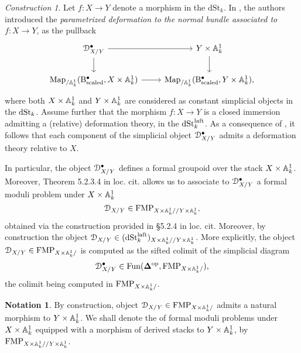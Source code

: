 \documentclass[10pt,a4paper,reqno]{amsart} %
\theoremstyle{plain}
\theoremstyle{definition}
\newtheorem{notation}[thm]{Notation}
\theoremstyle{remark}
\numberwithin{equation}{section}
\newtheorem{construction}[thm]{Construction}
\begin{document}
\begin{construction} \label{construction:def_to_the_normal_bundle}
    Let $f \colon X \to Y$ denote a morphism in the \infcat $\mathrm{dSt}_k$.
    In \cite[\S 9.3]{Gaitsgory_Study_II}, the authors introduced the \emph{parametrized deformation to the normal bundle associated to $f \colon X \to Y$}, as the pullback
        \[
        \begin{tikzcd}
            \cD^\bullet_{X/Y} \ar{r} \ar{d} &   Y \times \bbA^1_k \ar{d} \\
            \Map_{/ \bbA^1_k}(\mathrm{B}^\bullet_{\mathrm{scaled}}, X \times \bbA^1_k) \ar{r} & \Map_{/ \bbA^1_k}(\mathrm{B}^\bullet_{\mathrm{scaled}}, Y \times \bbA^1_k),
        \end{tikzcd}
        \]
    where both $X \times \mathbb A^1_k$ and $Y \times \mathbb A^1_k$ are considered as constant simplicial objects in the \infcat $\mathrm{dSt}_k$. Assume further that
    the morphism $f \colon X \to Y$ is a closed immersion admitting a (relative) deformation theory, in the \infcat $\mathrm{dSt}^{\mathrm{laft}}_k$.
    As a consequence of \cite[Theorem 9.2.3.4]{Gaitsgory_Study_II}, it follows that
    each component of the simplicial object
    $\mathcal D_{X/Y}^\bullet$ admits a deformation theory relative to $X$.
    
    In particular, the object $\mathcal D^\bullet_{X/ Y}$ defines a formal groupoid over the stack
    $X \times \mathbb A^1_k$. Moreover, Theorem 5.2.3.4 in loc. cit. allows us to associate to $\mathcal D^\bullet_{X/Y}$ a
    formal moduli problem under $X \times \mathbb A^1_k$
           \[
               \mathcal D_{X/Y} \in \mathrm{FMP}_{X \times \mathbb A^1_k/ / Y \times \mathbb A^1_k},
           \]
    obtained via the construction provided in \S 5.2.4 in loc. cit. Moreover, by construction the object $\mathcal D_{X/Y} \in (\mathrm{dSt}^{\mathrm{laft}}_k)_{X \times \mathbb A^1_k/ / Y \times \mathbb A^1_k}$.
    More explicitly, the object $\mathcal D_{X/ Y} \in \mathrm{FMP}_{X \times \mathbb A^1_k/ }$ is computed as the sifted colimit of the simplicial diagram
        \[
            \mathcal D_{X/ Y}^\bullet \in \operatorname{Fun}(\bm{\Delta} ^\mathrm{op}, \mathrm{FMP}_{X \times \mathbb A^1_k/ })  ,
        \]
    the colimit being computed in $\mathrm{FMP}_{X \times \mathbb A^1_k/ }$.
\end{construction}


\begin{notation}
    By construction, object $\mathcal D_{X/ Y} \in \mathrm{FMP}_{X \times \mathbb A^1_k/ }$ admits a natural morphism to $Y \times \mathbb A^1_k$. We shall denote the \infcat
    of formal moduli problems under $X \times \mathbb A^1_k$ equipped with a morphism of derived stacks to $Y \times \mathbb A^1_k$, by $\mathrm{FMP}_{X \times \mathbb A^1_k/ /Y \times \mathbb A^1_k}$.
\end{notation}
\end{document}
